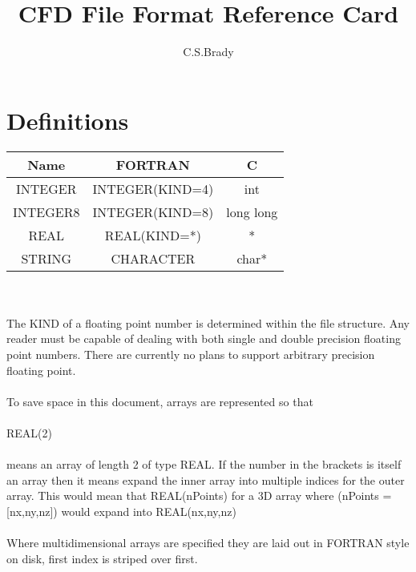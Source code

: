 \documentclass[8pt]{article}
\begin{document}
 

\title{CFD File Format Reference Card}
\author{C.S.Brady}
\maketitle
\section{Definitions}
\begin{tabular}{c | c | c}
Name & FORTRAN & C\\
\hline
INTEGER & INTEGER(KIND=4) & int\\
INTEGER8 & INTEGER(KIND=8)& long long\\
REAL     & REAL(KIND=*)& *\\
STRING   & CHARACTER & char*\\
\end{tabular}\\\\
The KIND of a floating point number is determined within the file structure. Any reader must be capable of dealing with both single and double precision floating point numbers. There are currently no plans to support arbitrary precision floating point.\\\\
To save space in this document, arrays are represented so that\\\\
REAL(2)\\\\
 means an array of length 2 of type REAL. If the number in the brackets is itself an array then it means expand the inner array into multiple indices for the outer array. This would mean that REAL(nPoints) for a 3D array where (nPoints =[nx,ny,nz]) would expand into REAL(nx,ny,nz)\\\\
 Where multidimensional arrays are specified they are laid out in FORTRAN style on disk, first index is striped over first.\\
\end{document}

